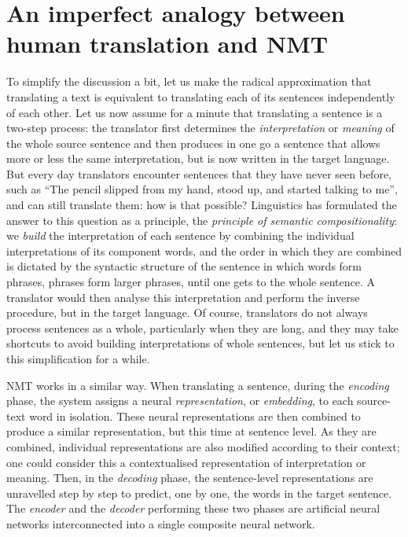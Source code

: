 \documentclass[output=paper,colorlinks,citecolor=brown]{langscibook}
\begin{document}
\section{An imperfect analogy between human translation and NMT}

To simplify the discussion a bit, let us make the radical approximation that translating a text is equivalent to translating each of its sentences independently of each other.
Let us now assume for a minute that translating a sentence is a two-step process: the translator first determines the \emph{interpretation} or \emph{meaning} of the whole source sentence and then produces in one go a sentence that allows more or less the same interpretation, but is now written in the target language. But every day translators encounter sentences that they have never seen before, such as ``The pencil slipped from my hand, stood up, and started talking to me'', and can still translate them: how is that possible? Linguistics has formulated the answer to this question as a principle, the \emph{principle of semantic compositionality}:
we \emph{build} the interpretation of each sentence by combining the individual interpretations of its component words, and the order in which they are combined is dictated by the syntactic structure of the sentence in which words form phrases, phrases form larger phrases, until one gets to the whole sentence. A translator would then analyse this interpretation and perform the inverse procedure, but in the target language. Of course, translators do not always process sentences as a whole, particularly when they are long, and they may take shortcuts to avoid building interpretations of whole sentences, but let us stick to this simplification for a while.

NMT works in a similar way. When translating a sentence, during the \emph{encoding} phase, the system assigns a neural \emph{representation}, or \emph{embedding}, to each source-text word in isolation. These neural representations are then combined to produce a similar representation, but this time at sentence level. As they are combined, individual representations are also modified according to their context; one could consider this a contextualised representation of  interpretation or meaning. Then, in the \emph{decoding} phase, the sentence-level representations are unravelled step by step to predict, one by one, the words in the target sentence. The \emph{encoder} and the \emph{decoder} performing these two phases are artificial neural networks interconnected into a single composite neural network.
\end{document}
